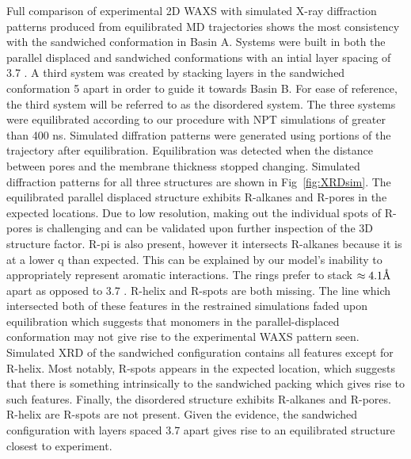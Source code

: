 Full comparison of experimental 2D WAXS with simulated X-ray diffraction
patterns produced from equilibrated MD trajectories shows the most consistency
with the sandwiched conformation in Basin A. Systems were built in both the 
parallel displaced and sandwiched conformations with an intial layer spacing of
3.7 \angstrom. A third system was created by stacking layers in the sandwiched 
conformation 5 \angstrom apart in order to guide it towards Basin B. For ease of
reference, the third system will be referred to as the disordered system. The 
three systems were equilibrated according to our procedure with NPT simulations of 
greater than 400 ns. Simulated diffration patterns were generated using 
portions of the trajectory after equilibration. Equilibration was detected
when the distance between pores and the membrane thickness stopped changing.
Simulated diffraction patterns for all three structures are shown in 
Fig~\ref{fig:XRDsim}. The equilibrated parallel displaced structure exhibits 
R-alkanes and R-pores in the expected locations. Due to low resolution, making
out the individual spots of R-pores is challenging and can be validated upon
further inspection of the 3D structure factor. R-pi is also present, however it
intersects R-alkanes because it is at a lower q than expected. This can be 
explained by our model's inability to appropriately represent aromatic interactions.
The rings prefer to stack $\approx 4.1 \textup{\AA}$ apart as opposed to 3.7 \angstrom.
R-helix and R-spots are both missing. The line which intersected both of these
features in the restrained simulations faded upon equilibration which suggests
that monomers in the parallel-displaced conformation may not give rise to the 
experimental WAXS pattern seen. Simulated XRD of the sandwiched configuration 
contains all features except for R-helix. Most notably, R-spots appears in the
expected location, which suggests that there is something intrinsically to
the sandwiched packing which gives rise to such features. Finally, the 
disordered structure exhibits R-alkanes and R-pores. R-helix are R-spots are not
present. Given the evidence, the sandwiched configuration with layers spaced
3.7 \angstrom apart gives rise to an equilibrated structure closest to experiment. 


